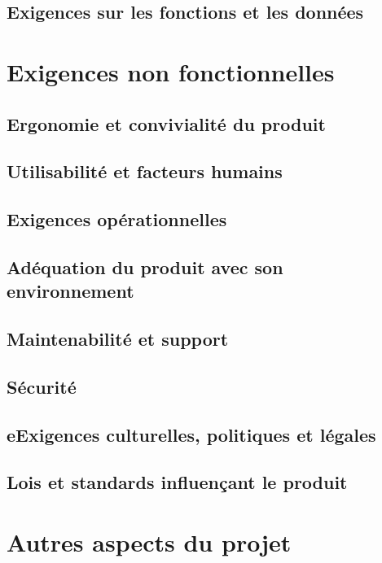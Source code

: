 		\subsection{Exigences sur les fonctions et les données}
		
	\section{Exigences non fonctionnelles}
		\subsection{Ergonomie et convivialité du produit}
		\subsection{Utilisabilité et facteurs humains}
		\subsection{Exigences opérationnelles}
		\subsection{Adéquation du produit avec son environnement}
		\subsection{Maintenabilité et support}
		\subsection{Sécurité}
		\subsection{eExigences culturelles, politiques et légales}
		\subsection{Lois et standards influençant le produit}
		
	\section{Autres aspects du projet}


